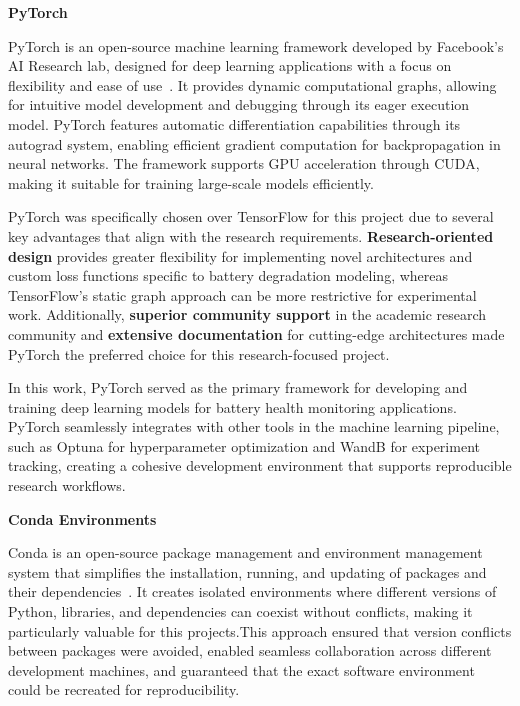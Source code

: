 \textbf{PyTorch}

PyTorch is an open-source machine learning framework developed by Facebook's AI Research lab, designed for deep learning applications with a 
focus on flexibility and ease of use~\cite{ansel_pytorch_2024}. It provides dynamic computational graphs, 
allowing for intuitive model development and debugging through its eager execution model. PyTorch features 
automatic differentiation capabilities through its autograd system, enabling efficient gradient computation 
for backpropagation in neural networks. The framework supports GPU acceleration through CUDA, making it suitable
for training large-scale models efficiently. 

PyTorch was specifically chosen over TensorFlow for this project due to several key advantages that align with the research requirements. \textbf{Research-oriented design} provides greater flexibility for implementing novel architectures and custom loss functions specific to battery degradation modeling, whereas TensorFlow's static graph approach can be more restrictive for experimental work. Additionally, \textbf{superior community support} in the academic research community and \textbf{extensive documentation} for cutting-edge architectures made PyTorch the preferred choice for this research-focused project.

In this work, PyTorch served as the primary framework for developing and training deep learning models for battery health monitoring applications. PyTorch seamlessly integrates with other tools in the machine learning pipeline, such as Optuna for hyperparameter optimization and WandB for experiment tracking, creating a cohesive development environment that supports reproducible research workflows.

\textbf{Conda Environments}

Conda is an open-source package management and environment management system that simplifies the installation, running, and updating of packages and 
their dependencies~\cite{conda_contributors_conda_2025}. It creates isolated environments where different versions of Python, libraries, 
and dependencies can coexist without conflicts, making it particularly valuable for this projects.This approach ensured that version conflicts between packages were avoided, enabled seamless collaboration across different 
development machines, and guaranteed that the exact software environment could be recreated for reproducibility.

